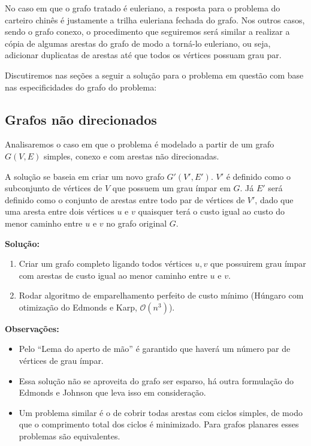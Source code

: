 \documentclass{article}
\begin{document}
No caso em que o grafo tratado é euleriano, a resposta para o problema do carteiro chinês é justamente a trilha euleriana fechada do grafo.
Nos outros casos, sendo o grafo conexo, o procedimento que seguiremos será similar a realizar a cópia de algumas arestas do grafo de modo a torná-lo euleriano, ou seja, adicionar duplicatas de arestas até que todos os vértices possuam grau par.

Discutiremos nas seções a seguir a solução para o problema em questão com base nas especificidades do grafo do problema:

\subsection{Grafos não direcionados}

Analisaremos o caso em que o problema é modelado a partir de um grafo $G(V, E)$ simples, conexo e com arestas não direcionadas.

A solução se baseia em criar um novo grafo $G'(V', E')$. 
$V'$ é definido como o subconjunto de vértices de $V$ que possuem um grau ímpar em $G$. 
Já $E'$ será definido como o conjunto de arestas entre todo par de vértices de $V'$, dado que uma aresta entre dois vértices $u$ e $v$ quaisquer terá o custo igual ao custo do menor caminho entre $u$ e $v$ no grafo original $G$.


\textbf{Solução:} 
\begin{enumerate}
    \item Criar um grafo completo ligando todos vértices $u, v$ que possuirem grau ímpar com arestas de custo igual ao menor caminho entre $u$ e $v$. 
    \item Rodar algoritmo de emparelhamento perfeito de custo mínimo (Húngaro com otimização do Edmonds e Karp, $\mathcal{O}(n^3)$).
\end{enumerate}


\textbf{Observações:}
\begin{itemize}
		\item Pelo ``Lema do aperto de mão'' é garantido que haverá um número par de vértices de grau ímpar.
		\item Essa solução não se aproveita do grafo ser esparso, há outra formulação do Edmonds e Johnson que leva isso em consideração.
		\item Um problema similar é o de cobrir todas arestas com ciclos simples, de modo que o comprimento total dos ciclos é minimizado. Para grafos planares esses problemas são equivalentes.
	\end{itemize}
\end{document}
